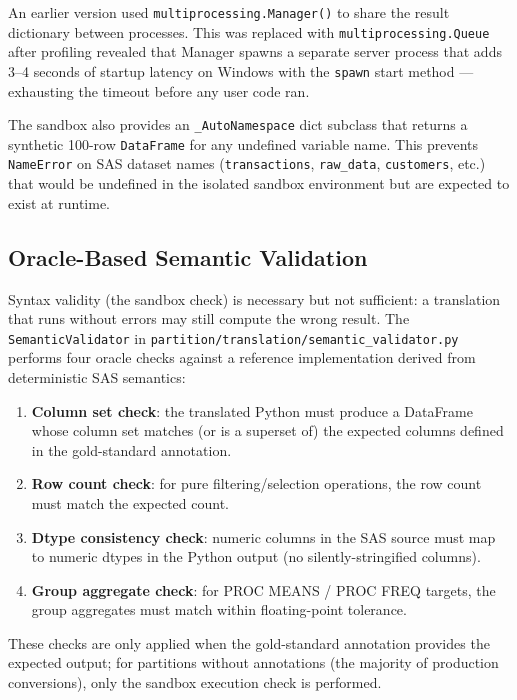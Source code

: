 An earlier version used \texttt{multiprocessing.Manager()} to share the result
dictionary between processes. This was replaced with \texttt{multiprocessing.Queue}
after profiling revealed that Manager spawns a separate server process that
adds 3--4 seconds of startup latency on Windows with the \texttt{spawn} start
method --- exhausting the timeout before any user code ran.

The sandbox also provides an \texttt{\_AutoNamespace} dict subclass that returns
a synthetic 100-row \texttt{DataFrame} for any undefined variable name. This
prevents \texttt{NameError} on SAS dataset names (\texttt{transactions},
\texttt{raw\_data}, \texttt{customers}, etc.) that would be undefined in the
isolated sandbox environment but are expected to exist at runtime.

\subsection{Oracle-Based Semantic Validation}
\label{subsec:semantic-validator-impl}

Syntax validity (the sandbox check) is necessary but not sufficient: a
translation that runs without errors may still compute the wrong result. The
\texttt{SemanticValidator} in
\texttt{partition/translation/semantic\_validator.py} performs four oracle
checks against a reference implementation derived from deterministic SAS
semantics:

\begin{enumerate}
  \item \textbf{Column set check}: the translated Python must produce a
    DataFrame whose column set matches (or is a superset of) the expected
    columns defined in the gold-standard annotation.
  \item \textbf{Row count check}: for pure filtering/selection operations,
    the row count must match the expected count.
  \item \textbf{Dtype consistency check}: numeric columns in the SAS source
    must map to numeric dtypes in the Python output (no silently-stringified
    columns).
  \item \textbf{Group aggregate check}: for PROC MEANS / PROC FREQ targets,
    the group aggregates must match within floating-point tolerance.
\end{enumerate}

These checks are only applied when the gold-standard annotation provides the
expected output; for partitions without annotations (the majority of
production conversions), only the sandbox execution check is performed.


